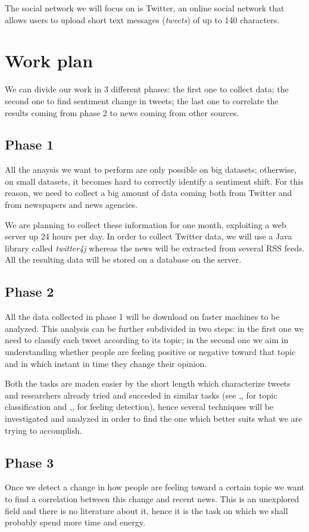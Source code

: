 \documentclass[a4paper]{article}
\begin{document}
The social network we will focus on is Twitter, an online social network that
allows users to upload short text messages (\emph{tweets}) of up to 140 characters.

\section{Work plan}
We can divide our work in 3 different phases: the first one to collect data; the
second one to find sentiment change in tweets; the last one to correlate the
results coming from phase 2 to news coming from other sources.

\subsection{Phase 1}
All the anaysis we want to perform are only possible on big datasets; otherwise,
on small datasets, it becomes hard to correctly identify a sentiment shift. For
this reason, we need to collect a big amount of data coming both from Twitter
and from newspapers and news agencies.

We are planning to collect these information for one month, exploiting a web
server up 24 hours per day. In order to collect Twitter data, we will use a Java
library called \emph{twitter4j} whereas the news will be extracted from several
RSS feeds. All the resulting data will be stored on a database on the server.

\subsection{Phase 2}
All the data collected in phase 1 will be download on faster machines to be
analyzed. This analysis can be further subdivided in two steps: in the first one
we need to classify each tweet according to its topic; in the second one we aim
in understanding whether people are feeling positive or negative toward that
topic and in which instant in time they change their opinion.

Both the tasks are maden easier by the short length which characterize tweets
and researchers already tried and succeded in similar tasks
(see \cite{Wang},\cite{Sriram},\cite{Lee} for topic classification and
 \cite{Bifet},\cite{Go},\cite{Palpanas} for feeling detection), hence several
techniques will be investigated and analyzed in order to find the one which
better suits what we are trying to accomplish.

\subsection{Phase 3}
Once we detect a change in how people are feeling toward a certain topic we want
to find a correlation between this change and recent news. This is an unexplored
field and there is no literature about it, hence it is the task on which we shall
probably spend more time and energy.
\end{document}

